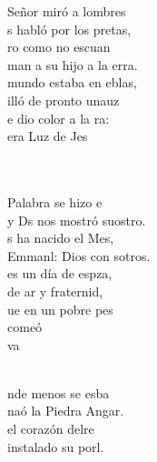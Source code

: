 \documentclass[12pt]{article}
\begin{document}
\begin{multicols*}{2}
\begin{cancion}%
	 Señor miró a lombres\\
	s habló por los pretas,\\
	ro como no escuan\\
	man a su hijo a la erra. \\
	 mundo estaba en eblas,\\
	illó de pronto unauz\\
	e dio color a la ra:\\
	era  Luz de Jes\\\jump\\
	\begin{chorus}%
	    \\
	 Palabra se hizo e\\
	y Ds nos mostró suostro.\\
	s ha nacido el Mes,\\
	Emmanl: Dios con sotros.\\
	es un día de espza,\\
	de ar y fraternid,\\
	ue en un pobre pes\\
	comeó   \\
	 va   \\
	\end{chorus}%
	\jump\\
\jump
	nde menos se esba\\
	naó la Piedra Angar.\\
	 el corazón delre\\
	 instalado su porl.\\

\end{cancion}
\end{multicols*}
\end{document}
